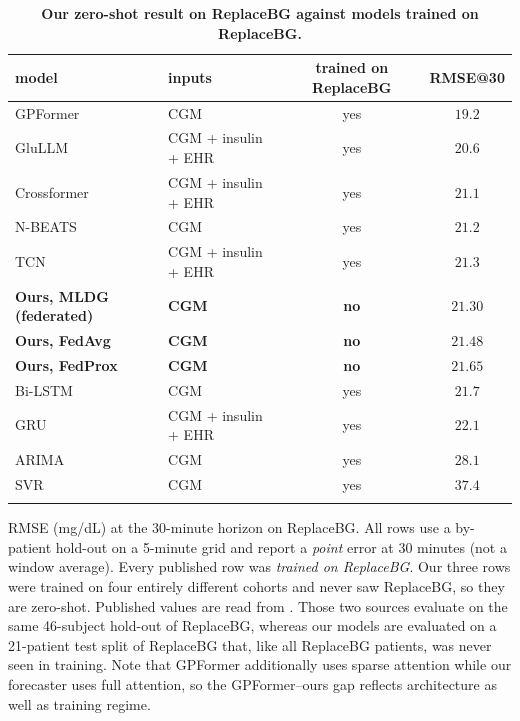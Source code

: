 \documentclass[10pt,letterpaper]{article}
\newlength\savedwidth
\newcommand\thickhline{\noalign{\global\savedwidth\arrayrulewidth\global\arrayrulewidth 2pt}%
\hline
\noalign{\global\arrayrulewidth\savedwidth}}
\begin{document}
\begin{table}[!ht]
\centering
\captionsetup{justification=centering,singlelinecheck=on}
\caption{\bf Our zero-shot result on ReplaceBG against models trained on ReplaceBG.}
\label{tab:oodprior}
\begin{tabular}{llcc}
\thickhline
model & inputs & trained on ReplaceBG & RMSE@30 \\
\hline
GPFormer \cite{zhu2024gpformer}    & CGM                & yes & $19.2$ \\
GluLLM \cite{zhu2026glullm}        & CGM + insulin + EHR & yes & $20.6$ \\
Crossformer \cite{zhu2026glullm}   & CGM + insulin + EHR & yes & $21.1$ \\
N-BEATS \cite{zhu2024gpformer}     & CGM                & yes & $21.2$ \\
TCN \cite{zhu2026glullm}           & CGM + insulin + EHR & yes & $21.3$ \\
\textbf{Ours, MLDG (federated)}   & \textbf{CGM}       & \textbf{no} & $\mathbf{21.30}$ \\
\textbf{Ours, FedAvg}             & \textbf{CGM}       & \textbf{no} & $\mathbf{21.48}$ \\
\textbf{Ours, FedProx}            & \textbf{CGM}       & \textbf{no} & $\mathbf{21.65}$ \\
Bi-LSTM \cite{zhu2024gpformer}     & CGM                & yes & $21.7$ \\
GRU \cite{zhu2026glullm}           & CGM + insulin + EHR & yes & $22.1$ \\
ARIMA \cite{zhu2024gpformer}       & CGM                & yes & $28.1$ \\
SVR \cite{zhu2024gpformer}         & CGM                & yes & $37.4$ \\
\thickhline
\end{tabular}
\begin{center}
{\small RMSE (mg/dL) at the 30-minute horizon on ReplaceBG. All rows use a
by-patient hold-out on a 5-minute grid and report a \emph{point} error at 30
minutes (not a window average). Every published row was \emph{trained on
ReplaceBG}. Our three rows were trained on four entirely different cohorts and
never saw ReplaceBG, so they are zero-shot. Published values are read from
\cite{zhu2024gpformer,zhu2026glullm}. Those two sources evaluate on the same
46-subject hold-out of ReplaceBG, whereas our models are evaluated on a 21-patient
test split of ReplaceBG that, like all ReplaceBG patients, was never seen in
training. Note that GPFormer additionally uses sparse attention while our
forecaster uses full attention, so the GPFormer--ours gap reflects architecture as
well as training regime.}
\end{center}
\end{table}
\end{document}
